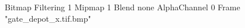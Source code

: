 {Bitmap
	{Filtering 1}
	{Mipmap 1}
	{Blend none}
	{AlphaChannel 0}
	{Frame "gate_depot_x.tif.bmp"}
}
